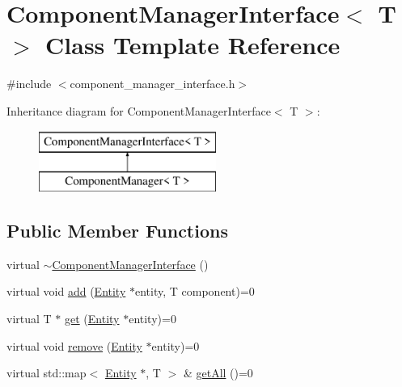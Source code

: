 \hypertarget{classComponentManagerInterface}{\section{Component\-Manager\-Interface$<$ T $>$ Class Template Reference}
\label{classComponentManagerInterface}
}


{\ttfamily \#include $<$component\-\_\-manager\-\_\-interface.\-h$>$}

Inheritance diagram for Component\-Manager\-Interface$<$ T $>$\-:\begin{figure}[H]
\begin{center}
\leavevmode
\includegraphics[height=2.000000cm]{classComponentManagerInterface}
\end{center}
\end{figure}
\subsection*{Public Member Functions}
\begin{DoxyCompactItemize}
\item 
virtual \hyperlink{classComponentManagerInterface_a4693483e5744014f340619627e0ee31b}{$\sim$\-Component\-Manager\-Interface} ()
\item 
virtual void \hyperlink{classComponentManagerInterface_a6eb928ae754e61c5cb65ac279706ba29}{add} (\hyperlink{classEntity}{Entity} $\ast$entity, T component)=0
\item 
virtual T $\ast$ \hyperlink{classComponentManagerInterface_aa56b700c4ea98e708c68ebbde3205fd9}{get} (\hyperlink{classEntity}{Entity} $\ast$entity)=0
\item 
virtual void \hyperlink{classComponentManagerInterface_a3ef2198d5c9661418bff0c9f194cb2ce}{remove} (\hyperlink{classEntity}{Entity} $\ast$entity)=0
\item 
virtual std\-::map$<$ \hyperlink{classEntity}{Entity} $\ast$, T $>$ \& \hyperlink{classComponentManagerInterface_a2ea45742be30438171b9b24fb36a5761}{get\-All} ()=0
\end{DoxyCompactItemize}


